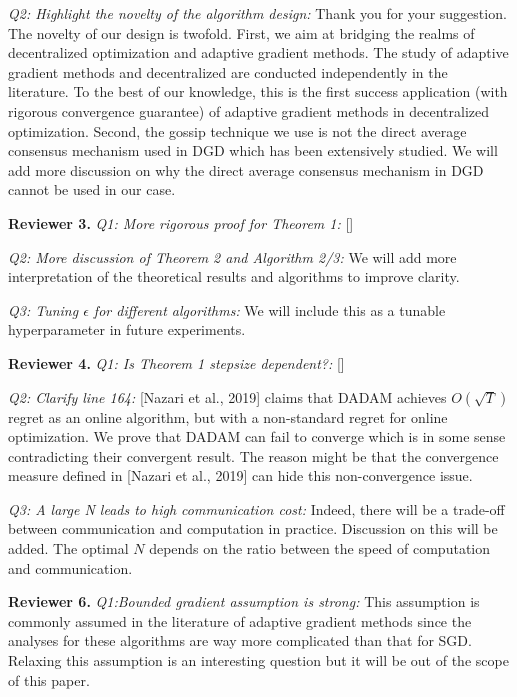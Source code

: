 \documentclass{article}
\begin{document}
\textit{Q2: Highlight the novelty of the algorithm design:}
Thank you for your suggestion.  The novelty of our design is twofold. 
First, we aim at bridging the realms of decentralized optimization and adaptive gradient methods. 
The study of adaptive gradient methods and decentralized are conducted independently in the literature. To the best of our knowledge, this is the first success application (with rigorous convergence guarantee) of adaptive gradient methods in decentralized optimization. 
Second, the gossip technique we use is not the direct average consensus mechanism used in DGD which has been extensively studied.
We will add more discussion on why the direct average consensus mechanism in DGD cannot be used in our case.

\textbf{Reviewer 3.}
\textit{Q1: More rigorous proof for Theorem 1:}
[]

\textit{Q2: More discussion of Theorem 2 and Algorithm 2/3:}
We will add more interpretation of the theoretical results and algorithms to improve clarity. 

\textit{Q3: Tuning $\epsilon$ for different algorithms:}
We will include this as a tunable hyperparameter in future experiments. 

\textbf{Reviewer 4.}
\textit{Q1: Is Theorem 1 stepsize dependent?:}
[]

\textit{Q2:  Clarify line 164:}
 [Nazari et al., 2019] claims that DADAM achieves $O(\sqrt{T})$ regret as an online algorithm, but with a non-standard regret for online optimization. 
 We prove that DADAM can fail to converge which is in some sense contradicting their convergent result. The reason might be that the convergence measure defined in [Nazari et al., 2019] can hide this non-convergence issue.

\textit{Q3: A large N leads to high communication cost:}
Indeed, there will be a trade-off between communication and computation in practice.
Discussion on this will be added.
The optimal $N$ depends on the ratio between the speed of computation and communication.   

\textbf{Reviewer 6.}
\textit{Q1:Bounded gradient assumption is strong:}
This assumption is commonly assumed in the literature of adaptive gradient methods since the analyses for these algorithms are way more complicated than that for SGD. 
Relaxing this assumption is an interesting question but it will be out of the scope of this paper.
\end{document}

